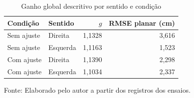 \begin{table}[H]\centering
\caption{Ganho global descritivo por sentido e condição}\label{tab:reanalise-ganhos}
\small\begin{tabular}{llrr}\toprule
Condição & Sentido & $g$ & RMSE planar (cm)\\\midrule
Sem ajuste & Direita & 1,1328 & 3,616\\
Sem ajuste & Esquerda & 1,1163 & 1,523\\
Com ajuste & Direita & 1,1390 & 2,298\\
Com ajuste & Esquerda & 1,1034 & 2,337\\
\bottomrule\end{tabular}\par\smallskip
{\footnotesize Fonte: Elaborado pelo autor a partir dos registros dos ensaios.}\end{table}
